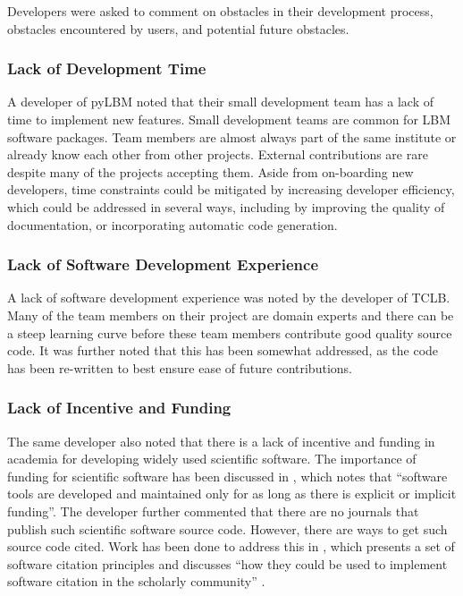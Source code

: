 \documentclass[final, 3p, times, authoryear]{elsarticle}
\begin{document}
Developers were asked to comment on obstacles in their development process,
obstacles encountered by users, and potential future obstacles.

\subsubsection{Lack of Development Time}

A developer of pyLBM noted that their small development team has a lack of time
to implement new features. Small development teams are common for LBM software
packages. Team members are almost always part of the same institute or already
know each other from other projects. External contributions are rare despite
many of the projects accepting them. Aside from on-boarding new developers, time
constraints could be mitigated by increasing developer efficiency, which could
be addressed in several ways, including by improving the quality of
documentation, or incorporating automatic code generation.

\subsubsection{Lack of Software Development Experience}

A lack of software development experience was noted by the developer of TCLB.
Many of the team members on their project are domain experts and there can be a
steep learning curve before these team members contribute good quality source
code. It was further noted that this has been somewhat addressed, as the code
has been re-written to best ensure ease of future contributions.

\subsubsection{Lack of Incentive and Funding}

The same developer also noted that there is a lack of incentive and funding in
academia for developing widely used scientific software. The importance of
funding for scientific software has been discussed in
\cite{gewaltig2012quality}, which notes that ``software tools are developed and
maintained only for as long as there is explicit or implicit funding''. The
developer further commented that there are no journals that publish such
scientific software source code. However, there are ways to get such source code
cited. Work has been done to address this in \citep{smith2016software}, which
presents a set of software citation principles and discusses ``how they could be
used to implement software citation in the scholarly community''
\citep{katz2019software}. 
\end{document}
